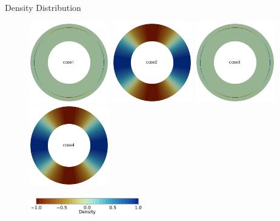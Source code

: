 \documentclass[10pt,aspectratio=169]{beamer}
\begin{document}
\begin{frame}[fragile]{Density Distribution}
	\begin{figure}[!htb]
		\begin{multicols}{4}
			\includegraphics[width=3.5cm]{./case1/rho_ana.png}\par
			\hspace{0.75in}
			\includegraphics[width=3.5cm]{./case2/rho_ana.png}\par
			\hspace{1.5in}
			\includegraphics[width=3.5cm]{./case3/rho_ana.png}\par
			\hspace{2.25in}
			\includegraphics[width=3.5cm]{./case4/rho_ana.png}\par
		\end{multicols}
	\end{figure}
	
	\vspace{-0.4in}
	
	\begin{figure}
		\hspace{0.2in} 
		\includegraphics[width=5cm]{./case1/rho_ana_cbhorz.pdf}
	\end{figure}
\end{frame}
\end{document}
